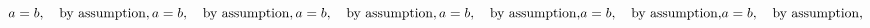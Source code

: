 \documentclass{sample}
\begin{document}
\begin{center}
\[
a = b,\quad \text{by assumption},

a = b, \text{\quad by assumption},

a = b,\text{\quad by assumption},

a = b,\quad \text{by assumption,}

a = b, \text{\quad by assumption,}

a = b,\text{\quad by assumption,}
\]
\end{center}
\end{document}
